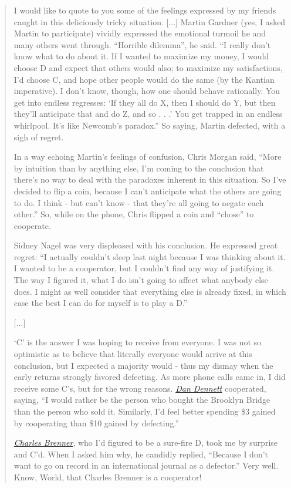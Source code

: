 \begin{quote}
I would like to quote to you some of the feelings expressed by my
friends caught in this deliciously tricky situation. {[}...{]} Martin
Gardner (yes, I asked Martin to participate) vividly expressed the
emotional turmoil he and many others went through. ``Horrible dilemma'',
he said. ``I really don't know what to do about it. If I wanted to
maximize my money, I would choose D and expect that others would also;
to maximize my satisfactions, I'd choose C, and hope other people would
do the same (by the Kantian imperative). I don't know, though, how one
should behave rationally. You get into endless regresses: `If they all
do X, then I should do Y, but then they'll anticipate that and do Z, and
so . . .' You get trapped in an endless whirlpool. It's like Newcomb's
paradox.'' So saying, Martin defected, with a sigh of regret.

In a way echoing Martin's feelings of confusion, Chris Morgan said,
``More by intuition than by anything else, I'm coming to the conclusion
that there's no way to deal with the paradoxes inherent in this
situation. So I've decided to flip a coin, because I can't anticipate
what the others are going to do. I think - but can't know - that they're
all going to negate each other.'' So, while on the phone, Chris flipped
a coin and ``chose'' to cooperate.

Sidney Nagel was very displeased with his conclusion. He expressed great
regret: ``I actually couldn't sleep last night because I was thinking
about it. I wanted to be a cooperator, but I couldn't find any way of
justifying it. The way I figured it, what I do isn't going to affect
what anybody else does. I might as well consider that everything else is
already fixed, in which case the best I can do for myself is to play a
D.''

{[}...{]}

`C' is the answer I was hoping to receive from everyone. I was not so
optimistic as to believe that literally everyone would arrive at this
conclusion, but I expected a majority would - thus my dismay when the
early returns strongly favored defecting. As more phone calls came in, I
did receive some C's, but for the wrong reasons.
\href{http://en.wikipedia.org/wiki/Dan\%20Dennett}{\emph{Dan Dennett}}
cooperated, saying, ``I would rather be the person who bought the
Brooklyn Bridge than the person who sold it. Similarly, I'd feel better
spending \$3 gained by cooperating than \$10 gained by defecting.''

\href{http://en.wikipedia.org/wiki/Charles\%20Brenner}{\emph{Charles
Brenner}}, who I'd figured to be a sure-fire D, took me by surprise and
C'd. When I asked him why, he candidly replied, ``Because I don't want
to go on record in an international journal as a defector.'' Very well.
Know, World, that Charles Brenner is a cooperator!


\end{quote}
